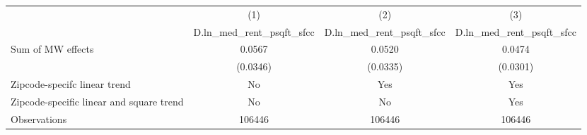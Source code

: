 {
\def\sym#1{\ifmmode^{#1}\else\(^{#1}\)\fi}
\begin{tabular}{l*{3}{c}}
\hline\hline
          &\multicolumn{1}{c}{(1)}&\multicolumn{1}{c}{(2)}&\multicolumn{1}{c}{(3)}\\
          &\multicolumn{1}{c}{D.ln\_med\_rent\_psqft\_sfcc}&\multicolumn{1}{c}{D.ln\_med\_rent\_psqft\_sfcc}&\multicolumn{1}{c}{D.ln\_med\_rent\_psqft\_sfcc}\\
\hline
Sum of MW effects&   0.0567         &   0.0520         &   0.0474         \\
          & (0.0346)         & (0.0335)         & (0.0301)         \\
\hline
Zipcode-specifc linear trend&       No         &      Yes         &      Yes         \\
Zipcode-specific linear and square trend&       No         &       No         &      Yes         \\
Observations&   106446         &   106446         &   106446         \\
\hline\hline
\end{tabular}
}
